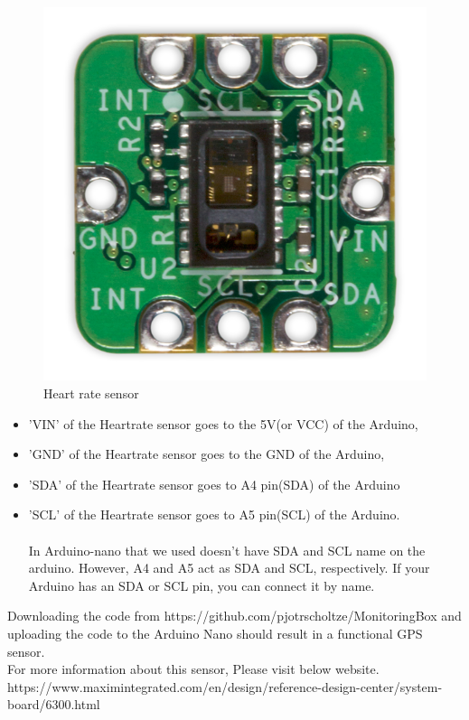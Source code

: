 \documentclass{report}
\begin{document}
\begin{figure}[H]
\begin{center}
\includegraphics[scale=0.25]{images/MAXREFDES117Fig00.png}
\caption{Heart rate sensor}
\end{center}
\end{figure}

\begin{itemize}
\item 'VIN' of the Heartrate sensor goes to the 5V(or VCC) of the Arduino, 
\item 'GND' of the Heartrate sensor goes to the GND of the Arduino,
\item 'SDA' of the Heartrate sensor goes to A4 pin(SDA) of the Arduino 
\item 'SCL' of the Heartrate sensor goes to A5 pin(SCL) of the Arduino.\\
\\In Arduino-nano that we used doesn't have SDA and SCL name on the arduino. However, A4 and A5 act as SDA and SCL, respectively. If your Arduino has an SDA or SCL pin, you can connect it by name.
 
\end{itemize}
Downloading the code from https://github.com/pjotrscholtze/MonitoringBox and uploading the code to the Arduino Nano should result in a functional GPS sensor. \\
For more information about this sensor, Please visit below website.\\
https://www.maximintegrated.com/en/design/reference-design-center/system-board/6300.html
\end{document}
